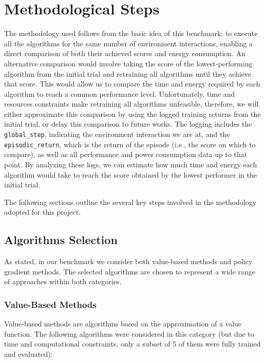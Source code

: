 \section[Methodological Steps]{Methodological Steps}
\label{sec:methodologies}

The methodology used follows from the basic idea of this benchmark: to execute all the algorithms for the same number of environment interactions, enabling a direct comparison of both their achieved scores and energy consumption.
An alternative comparison would involve taking the score of the lowest-performing algorithm from the initial trial and retraining all algorithms until they achieve that score. This would allow us to compare the time and energy required by each algorithm to reach a common performance level. Unfortunately, time and resources constraints make retraining all algorithms unfeasible, therefore, we will either approximate this comparison by using the logged training returns from the initial trial, or delay this comparison to future works. The logging includes the \verb*|global_step|, indicating the environment interaction we are at, and the \verb*|episodic_return|, which is the return of the episode (i.e., the score on which to compare), as well as all performance and power consumption data up to that point. By analyzing these logs, we can estimate how much time and energy each algorithm would take to reach the score obtained by the lowest performer in the initial trial. 

The following sections outline the several key steps involved in the methodology adopted for this project.

\subsection{Algorithms Selection}
\label{subsec:algorithm_selection}

As stated, in our benchmark we consider both value-based methods and policy gradient methods. The selected algorithms are chosen to represent a wide range of approaches within both categories.

\subsubsection{Value-Based Methods}

Value-based methods are algorithms based on the approximation of a value function. The following algorithms were considered in this category (but due to time and computational constraints, only a subset of 5 of them were fully trained and evaluated):

